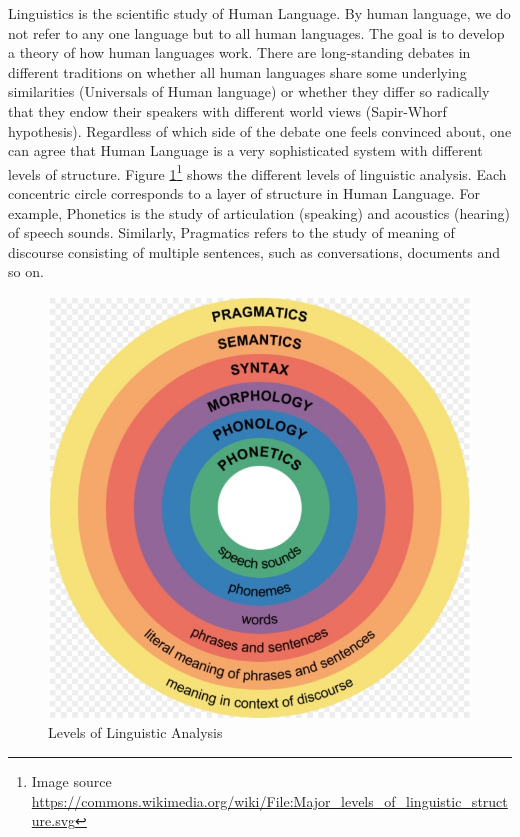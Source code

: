 \documentclass{article}
\begin{document}
Linguistics is the scientific study of Human Language. By human language, we do not refer to any one language but to all human languages. The goal is to develop a theory of how human languages work. There are long-standing debates in different traditions on whether all human languages share some underlying similarities (Universals of Human language) or whether they differ so radically that they endow their speakers with different world views (Sapir-Whorf hypothesis). Regardless of which side of the debate one feels convinced about, one can agree that Human Language is a very sophisticated system with different levels of structure. Figure \ref{fig:linguisticlevels}\footnote{Image source \url{https://commons.wikimedia.org/wiki/File:Major_levels_of_linguistic_structure.svg}} shows the different levels of linguistic analysis. Each concentric circle corresponds to a layer of structure in Human Language. For example, Phonetics is the study of articulation (speaking) and acoustics (hearing) of speech sounds. Similarly, Pragmatics refers to the study of meaning of discourse consisting of multiple sentences, such as conversations, documents and so on. 

\begin{figure}
    \centering
    \includegraphics[scale=0.6]{linguisticanalysis.jpg}
    \caption{Levels of Linguistic Analysis}
    \label{fig:linguisticlevels}
\end{figure}
\end{document}
